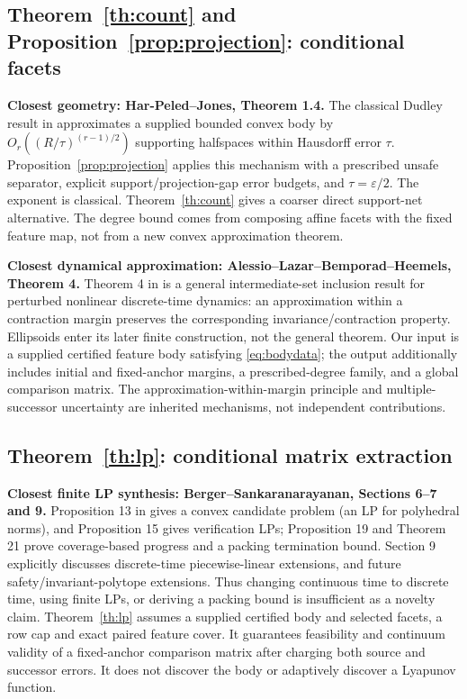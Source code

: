 \documentclass[journal,10pt]{IEEEtran}
\theoremstyle{definition}\newtheorem{definition}{Definition}
\theoremstyle{remark}
\begin{document}
\subsection{Theorem~\ref{th:count} and Proposition~\ref{prop:projection}: conditional facets}
\textbf{Closest geometry: Har-Peled--Jones, Theorem 1.4.}
The classical Dudley result in \cite{harpeled} approximates a supplied bounded
convex body by $O_r((R/\tau)^{(r-1)/2})$ supporting halfspaces within
Hausdorff error $\tau$. Proposition~\ref{prop:projection} applies this mechanism
with a prescribed unsafe separator, explicit support/projection-gap error
budgets, and $\tau=\varepsilon/2$. The exponent is classical.
Theorem~\ref{th:count} gives a coarser direct support-net alternative.
The degree bound comes from composing affine facets with the fixed feature map,
not from a new convex approximation theorem.

\textbf{Closest dynamical approximation: Alessio--Lazar--Bemporad--Heemels, Theorem 4.}
Theorem 4 in \cite{alessio} is a general intermediate-set inclusion result for
perturbed nonlinear discrete-time dynamics: an approximation within a
contraction margin preserves the corresponding invariance/contraction property.
Ellipsoids enter its later finite construction, not the general theorem.
Our input is a supplied certified feature body satisfying \eqref{eq:bodydata};
the output additionally includes initial and fixed-anchor margins, a
prescribed-degree family, and a global comparison matrix.
The approximation-within-margin principle and multiple-successor uncertainty
are inherited mechanisms, not independent contributions.

\subsection{Theorem~\ref{th:lp}: conditional matrix extraction}
\textbf{Closest finite LP synthesis: Berger--Sankaranarayanan, Sections 6--7 and 9.}
Proposition 13 in \cite{berger} gives a convex candidate problem (an LP for
polyhedral norms), and Proposition 15 gives verification LPs; Proposition 19 and Theorem 21 prove
coverage-based progress and a packing termination bound.
Section 9 explicitly discusses discrete-time piecewise-linear extensions,
and future safety/invariant-polytope extensions.
Thus changing continuous time to discrete time, using finite LPs, or deriving
a packing bound is insufficient as a novelty claim.
Theorem~\ref{th:lp} assumes a supplied certified body and selected facets,
a row cap and exact paired feature cover. It guarantees feasibility and
continuum validity of a fixed-anchor comparison matrix after charging both
source and successor errors. It does not discover the body or adaptively
discover a Lyapunov function.
\end{document}
